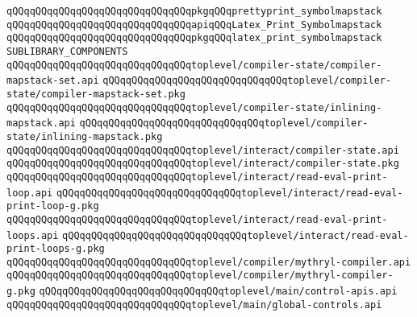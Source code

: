 \verb|qQQqqQQqqQQqqQQqqQQqqQQqqQQqqQQqpkgqQQqprettyprint_symbolmapstack|\newline
\newline
\verb|qQQqqQQqqQQqqQQqqQQqqQQqqQQqqQQqapiqQQqLatex_Print_Symbolmapstack|\newline
\verb|qQQqqQQqqQQqqQQqqQQqqQQqqQQqqQQqpkgqQQqlatex_print_symbolmapstack|\newline
\newline
\newline
\newline
\newline
\verb|SUBLIBRARY_COMPONENTS|\newline
\newline
\verb|qQQqqQQqqQQqqQQqqQQqqQQqqQQqqQQqtoplevel/compiler-state/compiler-mapstack-set.api|\newline
\verb|qQQqqQQqqQQqqQQqqQQqqQQqqQQqqQQqtoplevel/compiler-state/compiler-mapstack-set.pkg|\newline
\verb|qQQqqQQqqQQqqQQqqQQqqQQqqQQqqQQqtoplevel/compiler-state/inlining-mapstack.api|\newline
\verb|qQQqqQQqqQQqqQQqqQQqqQQqqQQqqQQqtoplevel/compiler-state/inlining-mapstack.pkg|\newline
\newline
\verb|qQQqqQQqqQQqqQQqqQQqqQQqqQQqqQQqtoplevel/interact/compiler-state.api|\newline
\verb|qQQqqQQqqQQqqQQqqQQqqQQqqQQqqQQqtoplevel/interact/compiler-state.pkg|\newline
\verb|qQQqqQQqqQQqqQQqqQQqqQQqqQQqqQQqtoplevel/interact/read-eval-print-loop.api|\newline
\verb|qQQqqQQqqQQqqQQqqQQqqQQqqQQqqQQqtoplevel/interact/read-eval-print-loop-g.pkg|\newline
\verb|qQQqqQQqqQQqqQQqqQQqqQQqqQQqqQQqtoplevel/interact/read-eval-print-loops.api|\newline
\verb|qQQqqQQqqQQqqQQqqQQqqQQqqQQqqQQqtoplevel/interact/read-eval-print-loops-g.pkg|\newline
\newline
\verb|qQQqqQQqqQQqqQQqqQQqqQQqqQQqqQQqtoplevel/compiler/mythryl-compiler.api|\newline
\verb|qQQqqQQqqQQqqQQqqQQqqQQqqQQqqQQqtoplevel/compiler/mythryl-compiler-g.pkg|\newline
\newline
\verb|qQQqqQQqqQQqqQQqqQQqqQQqqQQqqQQqtoplevel/main/control-apis.api|\newline
\verb|qQQqqQQqqQQqqQQqqQQqqQQqqQQqqQQqtoplevel/main/global-controls.api|\newline
